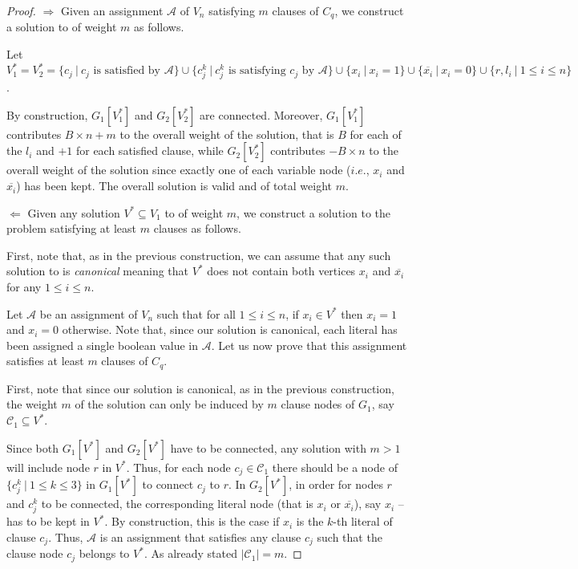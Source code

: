 		\begin{proof}

		{\parindent0pt
		$\boxed\Rightarrow$} Given an assignment $\mathcal{A}$ of $V_n$ satisfying $m$ clauses of $C_q$, we construct a solution to \mwccs{} of weight $m$ as follows.

		Let $V_1^*=V_2^*=\{c_j~\vert~ c_j \text{ is satisfied by } \mathcal{A}\} \cup \{c^k_j~\vert~ c^k_j \text{ is satisfying } c_j \text{ by } \mathcal{A}\}\cup\{x_i~\vert~ x_i=1\}\cup\{\overline{x_i}~\vert~ x_i=0\}\cup \{r,l_i~\vert~ 1\leq i\leq n\}$. 

		By construction, $G_1[V_1^*]$ and $G_2[V_2^*]$ are connected. Moreover, $G_1[V_1^*]$ contributes $B\times n+m$ to the overall weight of the solution, that is $B$ for each of the $l_i$ and $+1$ for each satisfied clause, while $G_2[V_2^*]$ contributes $-B\times n$ to the overall weight of the solution since exactly one of each variable node ($i.e.$, $x_i$ and $\overline{x_i}$) has been kept. The overall solution is valid and of total weight $m$.

		\vspace*{1em}
		{\parindent0pt
		$\boxed{\Leftarrow}$} Given any solution $V^*\subseteq V_1$ to \mwccs{} of weight $m$, we construct a solution to the \msat{} problem satisfying at least $m$ clauses as follows.

		First, note that, as in the previous construction, we can assume that any such solution to \mwccs{} is \textit{canonical} meaning that $V^*$ does not contain both vertices $x_i$ and $\overline{x_i}$ for any $1\leq i\leq n$.

		Let $\mathcal{A}$ be an assignment of $V_n$ such that for all $1\leq i\leq n$, if $x_i\in V^*$ then $x_i=1$ and $x_i=0$ otherwise. Note that, since our solution is canonical, each literal has been assigned a single boolean value in $\mathcal{A}$. Let us now prove that this assignment satisfies at least $m$ clauses of $C_q$.

		First, note that since our solution is canonical, as in the previous construction, the weight $m$ of the solution can only be induced by $m$ clause nodes of $G_1$, say $\mathcal{C}_1\subseteq V^*$.

		Since both $G_1[V^*]$ and $G_2[V^*]$ have to be connected, any solution with $m>1$ will include node $r$ in $V^*$. Thus, for each node $c_j\in\mathcal{C}_1$ there should be a node of $\{c_j^k ~\vert~ 1\leq k\leq 3\}$ in $G_1[V^*]$ to connect $c_j$ to $r$. In $G_2[V^*]$, in order for nodes $r$ and $c_j^k$ to be connected, the corresponding literal node (that is $x_i$ or $\overline{x_i}$), say $x_i$ -- has to be kept in $V^*$. By construction, this is the case if $x_i$ is the $k$-th literal of clause $c_j$. Thus, $\mathcal{A}$ is an assignment that satisfies any clause $c_j$ such that the clause node $c_j$ belongs to $V^*$. As already stated $|\mathcal{C}_1|=m$.
		\end{proof}

